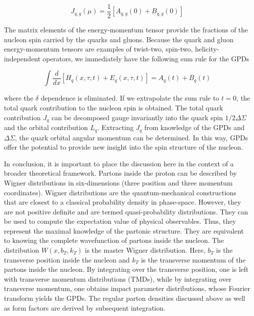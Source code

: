 \begin{equation}
J_{q,g}(\mu) = \frac{1}{2}[A_{q,g}(0) + B_{q,g}(0)]
\end{equation}


The matrix elements of the energy-momentum tensor provide the fractions of the nucleon spin carried by the quarks and gluons. Because the quark and gluon energy-momentum tensors are examples of twist-two, spin-two, helicity-independent operators, we immediately have the following sum rule for the GPDs

\begin{equation}
    \int \frac{d}{dx}[H_{q}(x, \tau, t) + E_{q}(x, \tau, t)] = A_{q}(t) + B_{q}(t)
\end{equation}

where the $\delta$ dependence is eliminated. If we extrapolate the sum rule to $t = 0$, the total quark contribution to the nucleon spin is obtained. The total quark contribution $J_q$ can be decomposed gauge invariantly into the quark spin $1/2\Delta\Sigma$ and the orbital contribution $L_q$. Extracting $J_q$ from knowledge of the GPDs and $\Delta\Sigma$, the quark orbital angular momentum can be determined. In this way, GPDs offer the potential to provide new insight into the spin structure of the nucleon.

In conclusion, it is important to place the discussion here in the context of a broader theoretical framework. Partons inside the proton can be described by Wigner distributions in six-dimensions (three position and three momentum coordinates). Wigner distributions are the quantum-mechanical constructions that are closest to a classical probability density in phase-space. However, they are not positive definite and are termed quasi-probability distributions. They can be used to compute the expectation value of physical observables. Thus, they represent the maximal knowledge of the partonic structure. They are equivalent to knowing the complete wavefunction of partons inside the nucleon. The distribution $W(x, b_T, k_T)$ is the master Wigner distribution. Here, $b_T$ is the transverse position inside the nucleon and $k_T$ is the transverse momentum of the partons inside the nucleon. By integrating over the transverse position, one is left with transverse momentum distributions (TMDs), while by integrating over transverse momentum, one obtains impact parameter distributions, whose Fourier transform yields the GPDs. The regular parton densities discussed above as well as form factors are derived by subsequent integration.


